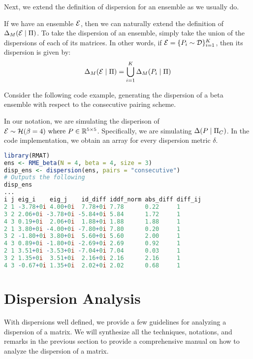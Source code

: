 Next, we extend the definition of dispersion for an ensemble as we usually do.

\begin{definition}
If we have an ensemble $\mathcal{E}$, then we can naturally extend the definition of $\Delta_M(\mathcal{E} \mid \Pi)$.
To take the dispersion of an ensemble, simply take the union of the dispersions of each of its matrices.
In other words, if $\mathcal{E} = \{P_i \sim \mathcal{D}\}_{i = 1}^K$, then its dispersion is given by:
$$\Delta_M(\mathcal{E} \mid \Pi) = \bigcup_{i=1}^K \Delta_M(P_i \mid \Pi)$$
\end{definition}

Consider the following code example, generating the dispersion of a beta ensemble with respect to the consecutive pairing scheme.

\begin{code}
In our notation, we are simulating the disperison of $\mathcal{E} \sim \mathcal{H}(\beta = 4) \text{ where } P \in \mathbb{R}^{5 \times 5}$.
Specifically, we are simulating $\Delta(P \mid \Pi_C)$. In the code implementation, we obtain an array for every dispersion metric $\delta$.
\end{code}
\begin{lstlisting}[language=R]
library(RMAT)
ens <- RME_beta(N = 4, beta = 4, size = 3)
disp_ens <- dispersion(ens, pairs = "consecutive")
# Outputs the following
disp_ens
...
i j eig_i    eig_j    id_diff iddf_norm abs_diff diff_ij
2 1 -3.78+0i 4.00+0i  7.78+0i 7.78      0.22     1
3 2 2.06+0i -3.78+0i -5.84+0i 5.84      1.72     1
4 3 0.19+0i  2.06+0i  1.88+0i 1.88      1.88     1
2 1 3.80+0i -4.00+0i -7.80+0i 7.80      0.20     1
3 2 -1.80+0i 3.80+0i  5.60+0i 5.60      2.00     1
4 3 0.89+0i -1.80+0i -2.69+0i 2.69      0.92     1
2 1 3.51+0i -3.53+0i -7.04+0i 7.04      0.03     1
3 2 1.35+0i  3.51+0i  2.16+0i 2.16      2.16     1
4 3 -0.67+0i 1.35+0i  2.02+0i 2.02      0.68     1
\end{lstlisting}


\section{Dispersion Analysis}

With dispersions well defined, we provide a few guidelines for analyzing a dispersion of a matrix.
We will synthesize all the techniques, notations, and remarks in the previous section to provide a comprehensive manual on how to analyze the dispersion of a matrix.

